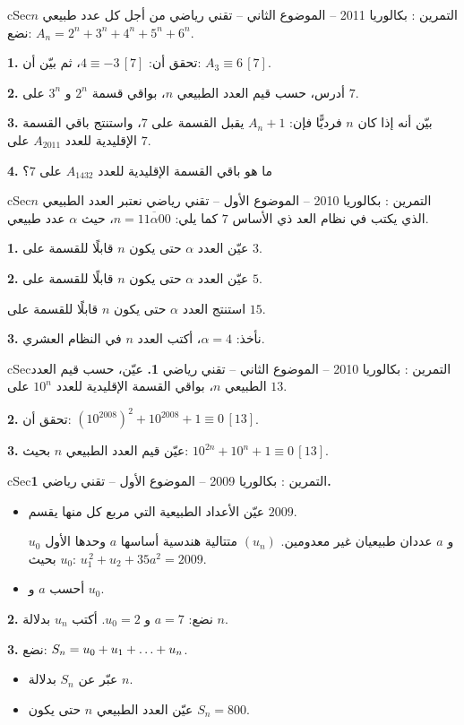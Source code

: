 \documentclass[12pt,a4paper]{article}
\newenvironment{BOX}[2]{\begin{otherlanguage}{english}\begin{arbox}{#1}{#2}}{\end{arbox}\end{otherlanguage}}
\newcounter{exo}
\newenvironment{tamrin}[1]{\stepcounter{exo}\begin{BOX}{cSec}{التمرين \theexo: #1}}{\end{BOX}}
\renewcommand{\dots}{\mathinner{\ldotp\ldotp\ldotp}}
\newenvironment{sq}{\begin{itemize}[leftmargin=2.4em,itemsep=3pt]}{\end{itemize}}
\newcommand{\qa}{\item[(أ)]}\newcommand{\qb}{\item[(ب)]}\newcommand{\qc}{\item[(جـ)]}\newcommand{\qd}{\item[(د)]}\newcommand{\qe}{\item[(هـ)]}
\begin{document}
\begin{tamrin}{بكالوريا 2011 -- الموضوع الثاني -- تقني رياضي}
من أجل كل عدد طبيعي $n$ نضع: $A_n=2^n+3^n+4^n+5^n+6^n$.

\textbf{1.} تحقق أن: $4\equiv-3\,[7]$، ثم بيّن أن: $A_3\equiv6\,[7]$.

\textbf{2.} أدرس، حسب قيم العدد الطبيعي $n$، بواقي قسمة $2^n$ و $3^n$ على $7$.

\textbf{3.} بيّن أنه إذا كان $n$ فرديًّا فإن: $A_n+1$ يقبل القسمة على $7$، واستنتج باقي القسمة الإقليدية للعدد $A_{2011}$ على $7$.

\textbf{4.} ما هو باقي القسمة الإقليدية للعدد $A_{1432}$ على $7$؟
\end{tamrin}

\begin{tamrin}{بكالوريا 2010 -- الموضوع الأول -- تقني رياضي}
نعتبر العدد الطبيعي $n$ الذي يكتب في نظام العد ذي الأساس $7$ كما يلي: $n=\overline{11\alpha00}$، حيث $\alpha$ عدد طبيعي.

\textbf{1.} عيّن العدد $\alpha$ حتى يكون $n$ قابلًا للقسمة على $3$.

\textbf{2.} عيّن العدد $\alpha$ حتى يكون $n$ قابلًا للقسمة على $5$.

استنتج العدد $\alpha$ حتى يكون $n$ قابلًا للقسمة على $15$.

\textbf{3.} نأخذ: $\alpha=4$، أكتب العدد $n$ في النظام العشري.
\end{tamrin}

\begin{tamrin}{بكالوريا 2010 -- الموضوع الثاني -- تقني رياضي}
\textbf{1.} عيّن، حسب قيم العدد الطبيعي $n$، بواقي القسمة الإقليدية للعدد $10^n$ على $13$.

\textbf{2.} تحقق أن: $\left(10^{2008}\right)^2+10^{2008}+1\equiv0\,[13]$.

\textbf{3.} عيّن قيم العدد الطبيعي $n$ بحيث: $10^{2n}+10^n+1\equiv0\,[13]$.
\end{tamrin}

\begin{tamrin}{بكالوريا 2009 -- الموضوع الأول -- تقني رياضي}
\textbf{1.}
\begin{sq}
\qa عيّن الأعداد الطبيعية التي مربع كل منها يقسم $2009$.

$u_0$ و $a$ عددان طبيعيان غير معدومين. $(u_n)$ متتالية هندسية أساسها $a$ وحدها الأول $u_0$ بحيث: $u_1^{\,2}+u_2+35a^2=2009$.
\qb أحسب $a$ و $u_0$.
\end{sq}

\textbf{2.} نضع: $a=7$ و $u_0=2$. أكتب $u_n$ بدلالة $n$.

\textbf{3.} نضع: $S_n=u_0+u_1+\dots+u_n$.
\begin{sq}
\qa عبّر عن $S_n$ بدلالة $n$.
\qb عيّن العدد الطبيعي $n$ حتى يكون $S_n=800$.
\end{sq}
\end{tamrin}
\end{document}

